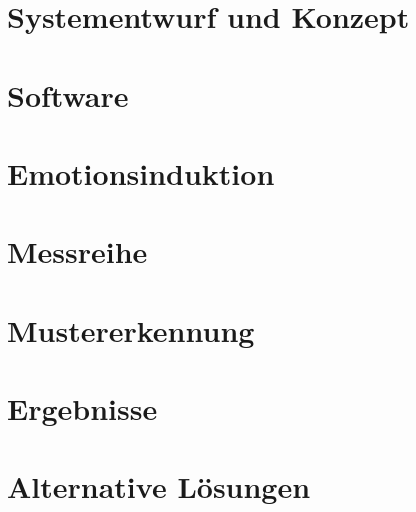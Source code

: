 

\section{Systementwurf und Konzept} \label{systementwurf-4}



\newpage
\section{Software} \label{realisierung-4}



\newpage
\section{Emotionsinduktion} \label{emotionsinduktion-4}



\newpage
\section{Messreihe} \label{messreihe-4}



\newpage
\section{Mustererkennung} \label{mustererkennung-4}


\newpage
\section{Ergebnisse} \label{ergenisse-4}


\newpage
\section{Alternative L{\"o}sungen} \label{alternativen-4}

